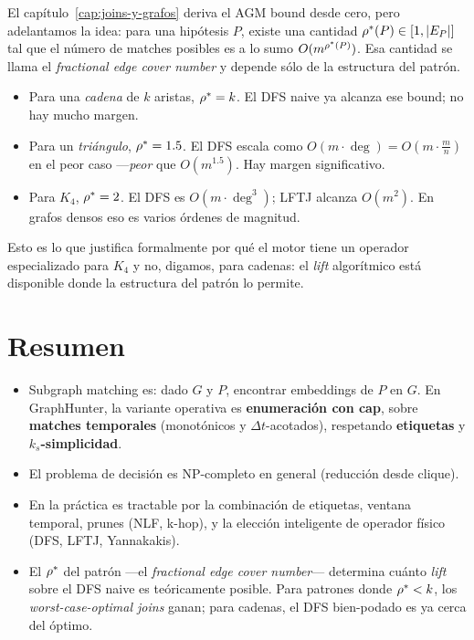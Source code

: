 El capítulo~\ref{cap:joins-y-grafos} deriva el AGM bound desde cero,
pero adelantamos la idea: para una hipótesis \(P\), existe una
cantidad \(\rho^{*}(P) \in [1, |E_P|]\) tal que el número de matches
posibles es a lo sumo \(O(m^{\rho^{*}(P)})\). Esa cantidad se llama
el \emph{fractional edge cover number} y depende sólo de la
estructura del patrón.

\begin{itemize}
    \item Para una \emph{cadena} de \(k\) aristas, \(\rho^{*} = k\).
    El DFS naive ya alcanza ese bound; no hay mucho margen.
    \item Para un \emph{triángulo}, \(\rho^{*} = 1.5\). El DFS
    escala como \(O(m \cdot \deg) = O(m \cdot \frac{m}{n})\) en el
    peor caso ---\emph{peor} que \(O(m^{1.5})\). Hay margen
    significativo.
    \item Para \(K_4\), \(\rho^{*} = 2\). El DFS es \(O(m \cdot
    \deg^3)\); LFTJ alcanza \(O(m^2)\). En grafos densos eso es
    varios órdenes de magnitud.
\end{itemize}

\noindent
Esto es lo que justifica formalmente por qué el motor tiene un
operador especializado para \(K_4\) y no, digamos, para cadenas: el
\emph{lift} algorítmico está disponible donde la estructura del
patrón lo permite.

\section{Resumen}

\begin{itemize}
    \item Subgraph matching es: dado \(G\) y \(P\), encontrar
    embeddings de \(P\) en \(G\). En GraphHunter, la variante
    operativa es \textbf{enumeración con cap}, sobre \textbf{matches
    temporales} (monotónicos y \(\Delta t\)-acotados), respetando
    \textbf{etiquetas} y \textbf{\(k_s\)-simplicidad}.
    \item El problema de decisión es NP-completo en general
    (reducción desde clique).
    \item En la práctica es tractable por la combinación de
    etiquetas, ventana temporal, prunes (NLF, k-hop), y la elección
    inteligente de operador físico (DFS, LFTJ, Yannakakis).
    \item El \(\rho^{*}\) del patrón ---el \emph{fractional edge
    cover number}--- determina cuánto \emph{lift} sobre el DFS naive
    es teóricamente posible. Para patrones donde \(\rho^{*} < k\),
    los \emph{worst-case-optimal joins} ganan; para cadenas, el
    DFS bien-podado es ya cerca del óptimo.
\end{itemize}

